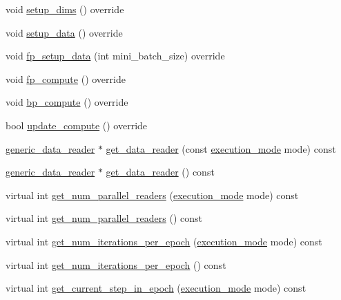 \begin{DoxyCompactItemize}
\item 
void \hyperlink{classlbann_1_1generic__input__layer_ad117da4e6155159439826bba6657cf05}{setup\+\_\+dims} () override
\item 
void \hyperlink{classlbann_1_1generic__input__layer_a8ca316b0369689949f3f4106920ec28f}{setup\+\_\+data} () override
\item 
void \hyperlink{classlbann_1_1generic__input__layer_ad0b8ea79bc508bd227e08124359531c8}{fp\+\_\+setup\+\_\+data} (int mini\+\_\+batch\+\_\+size) override
\item 
void \hyperlink{classlbann_1_1generic__input__layer_ae74c8c5a7e14b4fdd4902554bbc7bcef}{fp\+\_\+compute} () override
\item 
void \hyperlink{classlbann_1_1generic__input__layer_a36787a3caf2ef236747c6150edad82ea}{bp\+\_\+compute} () override
\item 
bool \hyperlink{classlbann_1_1generic__input__layer_aaf9ac19f7dd725230bde87d859ec0f35}{update\+\_\+compute} () override
\item 
\hyperlink{classlbann_1_1generic__data__reader}{generic\+\_\+data\+\_\+reader} $\ast$ \hyperlink{classlbann_1_1generic__input__layer_a5715a966647e8cc92489f9e1950b2d28}{get\+\_\+data\+\_\+reader} (const \hyperlink{base_8hpp_a2781a159088df64ed7d47cc91c4dc0a8}{execution\+\_\+mode} mode) const
\item 
\hyperlink{classlbann_1_1generic__data__reader}{generic\+\_\+data\+\_\+reader} $\ast$ \hyperlink{classlbann_1_1generic__input__layer_aba732becdb02627e3ad4493ac19e8fb6}{get\+\_\+data\+\_\+reader} () const
\item 
virtual int \hyperlink{classlbann_1_1generic__input__layer_a8a85d3e1bdd31082ca22535939596acb}{get\+\_\+num\+\_\+parallel\+\_\+readers} (\hyperlink{base_8hpp_a2781a159088df64ed7d47cc91c4dc0a8}{execution\+\_\+mode} mode) const
\item 
virtual int \hyperlink{classlbann_1_1generic__input__layer_a5ed2e13553574ba9ff54565ebc049982}{get\+\_\+num\+\_\+parallel\+\_\+readers} () const
\item 
virtual int \hyperlink{classlbann_1_1generic__input__layer_aa0fa6597ffce537f7cfba29dcc754ee1}{get\+\_\+num\+\_\+iterations\+\_\+per\+\_\+epoch} (\hyperlink{base_8hpp_a2781a159088df64ed7d47cc91c4dc0a8}{execution\+\_\+mode} mode) const
\item 
virtual int \hyperlink{classlbann_1_1generic__input__layer_a82bd22c834c5ef526e0c740c80451e1b}{get\+\_\+num\+\_\+iterations\+\_\+per\+\_\+epoch} () const
\item 
virtual int \hyperlink{classlbann_1_1generic__input__layer_abad654f945f62d4610f8afa597777713}{get\+\_\+current\+\_\+step\+\_\+in\+\_\+epoch} (\hyperlink{base_8hpp_a2781a159088df64ed7d47cc91c4dc0a8}{execution\+\_\+mode} mode) const

\end{DoxyCompactItemize}
